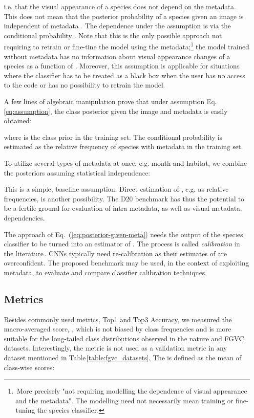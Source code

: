 \documentclass[10pt,twocolumn,letterpaper]{article}
\begin{document}
i.e. that the visual appearance of a species does not depend on the metadata.
This does not mean that the posterior probability of a species given an image is independent of metadata . The dependence under the assumption is via the conditional probability .
Note that this is the only possible approach not requiring to retrain or fine-tine the model using the metadata;\footnote{\,More precisely "not requiring modelling the dependence of visual appearance and the metadata". The modelling need not necessarily mean training or fine-tuning the species classifier.}
the model trained without metadata has no information about visual appearance changes of a species as a function of . Moreover, this assumption is applicable for situations where the classifier has to be treated as a black box when the user has no access to the code or has no possibility to retrain the model.

A few lines of algebraic manipulation prove  
 that under assumption Eq. \eqref{eq:assumption}, the class posterior given the image  and metadata  is easily obtained:

where  is the class prior in the training set.
The conditional probability  is estimated as the relative frequency of species  with metadata  in the training set.

To utilize several types of metadata at once, e.g. month and habitat, we combine the posteriors assuming statistical independence:

This is a simple, baseline assumption. Direct estimation of , e.g. as relative frequencies, is another possibility. The D20 benchmark has thus the potential to be a fertile ground for evaluation of intra-metadata, as well as visual-metadata, dependencies.

The approach of Eq.~(\ref{eq:posterior-given-meta}) needs
the output of the species classifier to be turned into an estimator of . The process is called {\it calibration} in the literature\,\cite{guo2017calibration,vaicenavicius2019evaluating}.
CNNs typically need re-calibration as their estimates of  are overconfident.
The proposed benchmark may be used, in the context of exploiting metadata, to evaluate and compare classifier calibration techniques.

\subsection{Metrics}
\label{metrics}

Besides commonly used metrics, Top1 and Top3 Accuracy, we measured the macro-averaged  score, , which is not biased by class frequencies and is more suitable for the long-tailed class distributions observed in the nature and FGVC datasets. Interestingly, the  metric is not used as a validation metric in any dataset mentioned in Table\,\ref{table:fgvc_datasets}. The  is defined as the mean of class-wise  scores:
\end{document}
